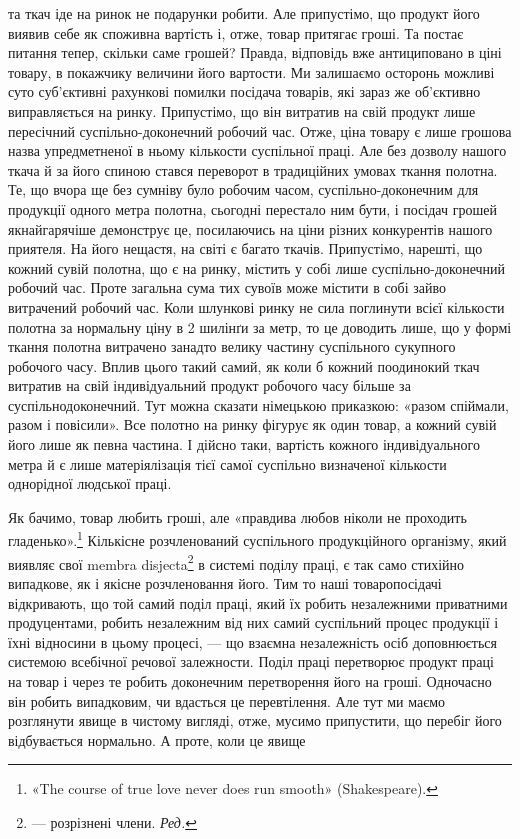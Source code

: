 та ткач іде на ринок не подарунки робити. Але припустімо, що
продукт його виявив себе як споживна вартість і, отже, товар
притягає гроші. Та постає питання тепер, скільки саме грошей?
Правда, відповідь вже антициповано в ціні товару, в покажчику
величини його вартости. Ми залишаємо осторонь можливі суто
суб’єктивні рахункові помилки посідача товарів, які зараз же
об’єктивно виправляється на ринку. Припустімо, що він витратив
на свій продукт лише пересічний суспільно-доконечний
робочий час. Отже, ціна товару є лише грошова назва упредметненої
в ньому кількости суспільної праці. Але без дозволу нашого
ткача й за його спиною стався переворот в традиційних умовах
ткання полотна. Те, що вчора ще без сумніву було робочим часом,
суспільно-доконечним для продукції одного метра полотна,
сьогодні перестало ним бути, і посідач грошей якнайгарячіше
демонструє це, посилаючись на ціни різних конкурентів нашого
приятеля. На його нещастя, на світі є багато ткачів. Припустімо,
нарешті, що кожний сувій полотна, що є на ринку, містить у
собі лише суспільно-доконечний робочий час. Проте загальна
сума тих сувоїв може містити в собі зайво витрачений робочий
час. Коли шлункові ринку не сила поглинути всієї кількости
полотна за нормальну ціну в 2 шилінґи за метр, то це доводить
лише, що у формі ткання полотна витрачено занадто велику
частину суспільного сукупного робочого часу. Вплив цього
такий самий, як коли б кожний поодинокий ткач витратив на
свій індивідуальний продукт робочого часу більше за суспільнодоконечний.
Тут можна сказати німецькою приказкою: «разом
спіймали, разом і повісили». Все полотно на ринку фігурує як
один товар, а кожний сувій його лише як певна частина. І дійсно
таки, вартість кожного індивідуального метра й є лише матеріялізація
тієї самої суспільно визначеної кількости однорідної
людської праці.

Як бачимо, товар любить гроші, але «правдива любов ніколи
не проходить гладенько».\footnote*{
«The course of true love never does run smooth» (Shakespeare).
} Кількісне розчленований суспільного
продукційного організму, який виявляє свої membra disjecta\footnote*{
— розрізнені члени. \emph{Ред.}
}
в системі поділу праці, є так само стихійно випадкове, як і якісне
розчленовання його. Тим то наші товаропосідачі відкривають, що
той самий поділ праці, який їх робить незалежними приватними
продуцентами, робить незалежним від них самий суспільний процес
продукції і їхні відносини в цьому процесі, — що взаємна
незалежність осіб доповнюється системою всебічної речової залежности.
Поділ праці перетворює продукт праці на товар і через те
робить доконечним перетворення його на гроші. Одночасно він
робить випадковим, чи вдасться це перевтілення. Але тут ми маємо
розглянути явище в чистому вигляді, отже, мусимо припустити,
що перебіг його відбувається нормально. А проте, коли це явище